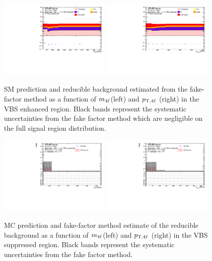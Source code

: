 \begin{figure}[htb]
	\centering
	\includegraphics[width=0.48\textwidth]{figures/Analysis/Background/RedStack_VBSEnhanced_M4l.pdf}
	\includegraphics[width=0.48\textwidth]{figures/Analysis/Background/RedStack_VBSEnhanced_Pt4l.pdf}
	\caption{ SM prediction and reducible background estimated from the fake-factor method as a function of $m_{4\ell}$(left) and $p_{\textrm{T} ,4\ell}$ (right) in the VBS enhanced region. Black bands represent the systematic uncertainties from the fake factor method which are negligible on the full signal region distribution. \label{fig:MCFFRedStack} }
\end{figure}

\begin{figure}[htb]
	\centering
	\includegraphics[width=0.48\textwidth]{figures/Analysis/Background/MCRedCompare_VBS_Suppressed_M4l.pdf}
	\includegraphics[width=0.48\textwidth]{figures/Analysis/Background/MCRedCompare_VBS_Suppressed_Pt4l.pdf}
	\caption{ MC prediction and fake-factor method estimate of the reducible background as a function of $m_{4\ell}$(left) and $p_{\textrm{T} ,4\ell}$ (right) in the VBS suppressed region. Black bands represent the systematic uncertainties from the fake factor method. \label{fig:MCFFRedComparison_VBSSup}}
\end{figure}

